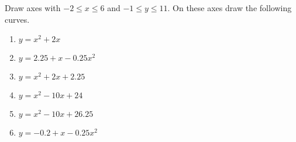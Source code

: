 \documentclass{article}
\begin{document}
\LARGE

\noindent Draw axes with \(-2 \le x \le 6\) and \(-1 \le y \le 11\).
On these axes draw the following curves.

\begin{enumerate}
\item \(y = x^2 + 2 x\)
\item \(y = 2.25 + x - 0.25 x^2\)
\item \(y = x^2 + 2 x + 2.25\)
\item \(y = x^2 - 10 x + 24\)
\item \(y = x^2 - 10 x + 26.25\)
\item \(y = -0.2 + x - 0.25 x^2\)
\end{enumerate}
\end{document}
